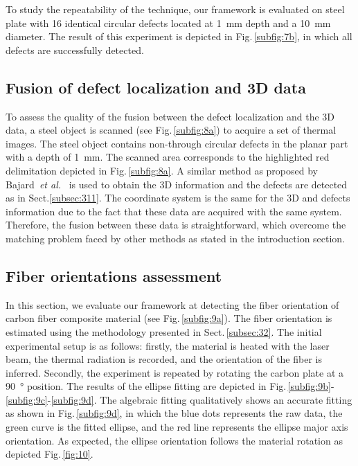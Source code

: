 \documentclass[12pt]{spieman}
\begin{document}
\begin{spacing}{2}
To study the repeatability of the technique, our framework is evaluated on steel plate with 16 identical circular defects located at \SI{1}{\milli \metre} depth and a \SI{10}{\milli \metre} diameter. 
The result of this experiment is depicted in Fig.\,\ref{subfig:7b}, in which all defects are successfully detected.



\subsection{Fusion of defect localization and 3D data}

To assess the quality of the fusion between the defect localization and the 3D data, a steel object is scanned (see Fig.\,\ref{subfig:8a}) to acquire a set of thermal images.
The steel object contains non-through circular defects in the planar part with a depth of \SI{1}{\milli \metre}.
The scanned area corresponds to the highlighted red delimitation depicted in Fig.\,\ref{subfig:8a}.
A similar method as proposed by Bajard~\emph{et al.}~\cite{Bajard2012} is used to obtain the 3D information and the defects are detected as in Sect.\ref{subsec:311}.
The coordinate system is the same for the 3D and defects information due to the fact that these data are acquired with the same system.
Therefore, the fusion between these data is straightforward, which overcome the matching problem faced by other methods as stated in the introduction section.


\subsection{Fiber orientations assessment}

In this section, we evaluate our framework at detecting the fiber orientation of carbon fiber composite material (see Fig.\,\ref{subfig:9a}).
The fiber orientation is estimated using the methodology presented in Sect.\,\ref{subsec:32}.
The initial experimental setup is as follows: 
firstly, the material is heated with the laser beam, the thermal radiation is recorded, and the orientation of the fiber is inferred. 
Secondly, the experiment is repeated by rotating the carbon plate at a \SI{90}{\degree} position.
The results of the ellipse fitting are depicted in Fig.\,\ref{subfig:9b}-\ref{subfig:9c}-\ref{subfig:9d}.
The algebraic fitting qualitatively shows an accurate fitting as shown in Fig.\,\ref{subfig:9d}, in which the blue dots represents the raw data, the green curve is the fitted ellipse, and the red line represents the ellipse major axis orientation.
As expected, the ellipse orientation follows the material rotation as depicted Fig.\,\ref{fig:10}.



\end{spacing}
\end{document}
